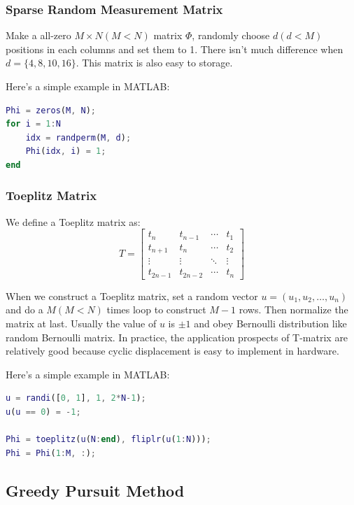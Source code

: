 \documentclass[12pt]{ctexart}
\begin{document}
\subsubsection{\textbf{Sparse Random Measurement Matrix}}

Make a all-zero $M \times N (M < N)$ matrix $\Phi$, randomly choose $d (d < M)$ positions in each
columns and set them to 1. There isn't much difference when $d = \{4, 8, 10, 16\}$. This matrix
is also easy to storage.

Here's a simple example in MATLAB:

\begin{lstlisting}[language=Matlab]
%% Sparse Random Measurement Matrix Example
Phi = zeros(M, N);
for i = 1:N
    idx = randperm(M, d);
    Phi(idx, i) = 1;
end
\end{lstlisting}

\subsubsection{\textbf{Toeplitz Matrix}}

We define a Toeplitz matrix as:
\[
  T = \begin{bmatrix}
    t_n & t_{n-1} & \cdots & t_1 \\
    t_{n+1} & t_n & \cdots & t_2 \\
    \vdots & \vdots & \ddots & \vdots \\
    t_{2n-1} & t_{2n-2} & \cdots & t_n
  \end{bmatrix}
\]

When we construct a Toeplitz matrix, set a random vector $u = (u_1, u_2, \ldots, u_n)$ and
do a $M (M < N)$ times loop to construct $M-1$ rows. Then normalize the matrix at last.
Usually the value of $u$ is $\pm 1$ and obey Bernoulli distribution like random Bernoulli
matrix. In practice, the application prospects of T-matrix are relatively good because
cyclic displacement is easy to implement in hardware.

Here's a simple example in MATLAB:

\begin{lstlisting}[language=Matlab]
%% Toeplitz Matrix Example
u = randi([0, 1], 1, 2*N-1);
u(u == 0) = -1;

Phi = toeplitz(u(N:end), fliplr(u(1:N)));
Phi = Phi(1:M, :);
\end{lstlisting}

\subsection{\textbf{Greedy Pursuit Method}}
\end{document}

